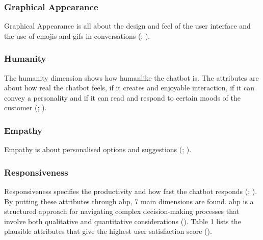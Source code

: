 \subsubsection{Graphical Appearance}
Graphical Appearance is all about the design and feel of the user interface and the use of emojis and gifs in conversations (\cite{Muizzah2021}; \cite{Verkeyn2018}). 

\subsubsection{Humanity}
The humanity dimension shows how humanlike the chatbot is. The attributes are about how real the chatbot feels, if it creates and enjoyable interaction, if it can convey a personality and if it can read and respond to certain moods of the customer (\cite{Muizzah2021}; \cite{Verkeyn2018}). 

\subsubsection{Empathy}
Empathy is about personalised options and suggestions (\cite{Muizzah2021}; \cite{Verkeyn2018}). 

\subsubsection{Responsiveness}
Responsiveness specifies the productivity and how fast the chatbot responds (\cite{Muizzah2021}; \cite{Verkeyn2018}).
\break
\break
By putting these attributes through \acrfull{ahp}, 7 main dimensions are found. \acrshort{ahp} is a structured approach for navigating complex decision-making processes that involve both qualitative and quantitative considerations (\cite{Radziwil2021}). Table 1 lists the plausible attributes that give the highest user satisfaction score (\cite{Muizzah2021}).

